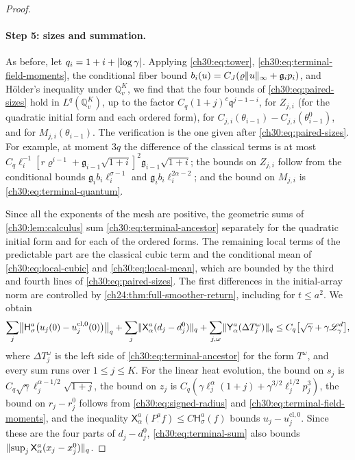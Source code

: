 \begin{proof}
\paragraph{Step 5: sizes and summation.} As before, let $q_i=1+i+\lvert \log\gamma\rvert$. Applying \eqref{ch30:eq:tower}, \eqref{ch30:eq:terminal-field-moments}, the conditional fiber bound $b_i(u)=C_J(\varrho\lVert u\rVert_\infty+\mathfrak g_ip_i)$, and H\"older's inequality under $\mathbb Q_v^K$, we find that the four bounds of \eqref{ch30:eq:paired-sizes} hold in $L^q(\mathbb Q_v^K)$, up to the factor $C_q(1+j)^c\mathfrak q^{j-1-i}$, for $Z_{j,i}$ (for the quadratic initial form and each ordered form), for $C_{j,i}(\theta_{i-1})-C_{j,i}(\theta^0_{i-1})$, and for $M_{j,i}(\theta_{i-1})$. The verification is the one given after \eqref{ch30:eq:paired-sizes}. For example, at moment $3q$ the difference of the classical terms is at most $C_q\ell_i^{-1}[r\varrho^{i-1}+\mathfrak g_{i-1}\sqrt{1+i}]^2\mathfrak g_{i-1}\sqrt{1+i}$; the bounds on $Z_{j,i}$ follow from the conditional bounds $\mathfrak g_ib_i\ell_i^{\sigma-1}$ and $\mathfrak g_ib_i\ell_i^{2\alpha-2}$; and the bound on $M_{j,i}$ is \eqref{ch30:eq:terminal-quantum}.

Since all the exponents of the mesh are positive, the geometric sums of \cref{ch30:lem:calculus} sum \eqref{ch30:eq:terminal-ancestor} separately for the quadratic initial form and for each of the ordered forms. The remaining local terms of the predictable part are the classical cubic term and the conditional mean of \eqref{ch30:eq:local-cubic} and \eqref{ch30:eq:local-mean}, which are bounded by the third and fourth lines of \eqref{ch30:eq:paired-sizes}. The first differences in the initial-array norm are controlled by \cref{ch24:thm:full-smoother-return}, including for $t\le a^2$. We obtain
\begin{equation}\label{ch30:eq:terminal-sum}
 \sum_j\bigl\lVert\mathsf H_\sigma^a\bigl(u_j(0)-u_j^{\mathrm{cl},0}(0)\bigr)\bigr\rVert_q+\sum_j\lVert \mathsf X_\alpha^a(d_j-d_j^0)\rVert_q+\sum_{j,\omega}\lVert \mathsf Y_\alpha^a(\Delta T^\omega_j)\rVert_q\le C_q\bigl[\sqrt\gamma+\gamma\mathscr L_\gamma^d\bigr],
\end{equation}
where $\Delta T^\omega_j$ is the left side of \eqref{ch30:eq:terminal-ancestor} for the form $T^\omega$, and every sum runs over $1\le j\le K$. For the linear heat evolution, the bound on $s_j$ is $C_q\sqrt\gamma\ell_j^{\alpha-1/2}\sqrt{1+j}$, the bound on $z_j$ is $C_q(\gamma\ell_j^\alpha(1+j)+\gamma^{3/2}\ell_j^{1/2}p_j^3)$, the bound on $r_j-r_j^0$ follows from \eqref{ch30:eq:signed-radius} and \eqref{ch30:eq:terminal-field-moments}, and the inequality $\mathsf X_\alpha^a(P_\cdot^af)\le C\mathsf H_\sigma^a(f)$ bounds $u_j-u_j^{\mathrm{cl},0}$. Since these are the four parts of $d_j-d_j^0$, \eqref{ch30:eq:terminal-sum} also bounds $\lVert \sup_j\mathsf X_\alpha^a(x_j-x_j^0)\rVert_q$.


\end{proof}
